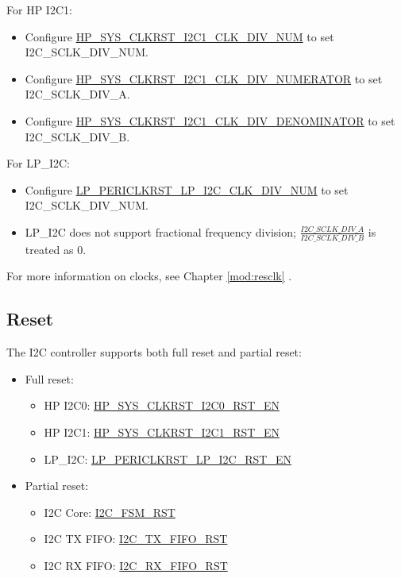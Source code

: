 \documentclass[main\_\_EN.tex]{subfiles}
\begin{document}
For HP I2C1:

\begin{itemize}
    \item Configure \hyperref[fielddesc:HPSYSCLKRSTI2C1CLKDIVNUM]{HP\_SYS\_CLKRST\_I2C1\_CLK\_DIV\_NUM} to set I2C\_SCLK\_DIV\_NUM.
    \item Configure \hyperref[fielddesc:HPSYSCLKRSTI2C1CLKDIVNUMERATOR]{HP\_SYS\_CLKRST\_I2C1\_CLK\_DIV\_NUMERATOR} to set I2C\_SCLK\_DIV\_A.
    \item Configure \hyperref[fielddesc:HPSYSCLKRSTI2C1CLKDIVDENOMINATOR]{HP\_SYS\_CLKRST\_I2C1\_CLK\_DIV\_DENOMINATOR} to set I2C\_SCLK\_DIV\_B.
\end{itemize}

For LP\_I2C:

\begin{itemize}
    \item Configure \hyperref[fielddesc:LPPERICLKRSTLPI2CCLKDIVNUM]{LP\_PERICLKRST\_LP\_I2C\_CLK\_DIV\_NUM} to set I2C\_SCLK\_DIV\_NUM.
    \item LP\_I2C does not support fractional frequency division; $\frac{I2C\_SCLK\_DIV\_A}{I2C\_SCLK\_DIV\_B}$ is treated as 0.
\end{itemize}

For more information on clocks, see Chapter \ref{mod:resclk} \textit{}.


\subsection{Reset}

The I2C controller supports both full reset and partial reset:

\begin{itemize}
    \item Full reset:
    \begin{itemize}
        \item HP I2C0: \hyperref[fielddesc:HPSYSCLKRSTI2C0RSTEN]{HP\_SYS\_CLKRST\_I2C0\_RST\_EN}
        \item HP I2C1: \hyperref[fielddesc:HPSYSCLKRSTI2C1RSTEN]{HP\_SYS\_CLKRST\_I2C1\_RST\_EN}
        \item LP\_I2C: \hyperref[fielddesc:LPPERICLKRSTLPI2CRSTEN]{LP\_PERICLKRST\_LP\_I2C\_RST\_EN}
    \end{itemize}
    \item Partial reset:
    \begin{itemize}
        \item I2C Core: \hyperref[fielddesc:I2CFSMRST]{I2C\_FSM\_RST}
        \item I2C TX FIFO: \hyperref[fielddesc:I2CTXFIFORST]{I2C\_TX\_FIFO\_RST}
        \item I2C RX FIFO: \hyperref[fielddesc:I2CRXFIFORST]{I2C\_RX\_FIFO\_RST}
    \end{itemize}
\end{itemize}
\end{document}
